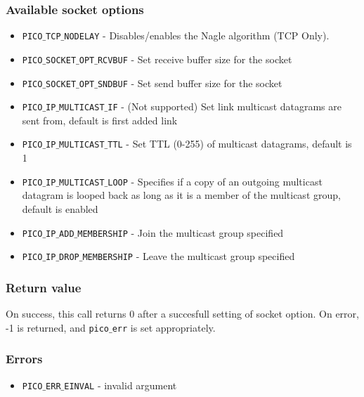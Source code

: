 \subsubsection*{Available socket options}
\begin{itemize}[noitemsep]
\item \texttt{PICO$\_$TCP$\_$NODELAY} - Disables/enables the Nagle algorithm (TCP Only). 
\item \texttt{PICO$\_$SOCKET$\_$OPT$\_$RCVBUF} - Set receive buffer size for the socket
\item \texttt{PICO$\_$SOCKET$\_$OPT$\_$SNDBUF} - Set send buffer size for the socket 
\item \texttt{PICO$\_$IP$\_$MULTICAST$\_$IF} - (Not supported) Set link multicast datagrams are sent from, default is first added link
\item \texttt{PICO$\_$IP$\_$MULTICAST$\_$TTL} - Set TTL (0-255) of multicast datagrams, default is 1
\item \texttt{PICO$\_$IP$\_$MULTICAST$\_$LOOP} - Specifies if a copy of an outgoing multicast datagram is looped back as long as it is a member of the multicast group, default is enabled
\item \texttt{PICO$\_$IP$\_$ADD$\_$MEMBERSHIP} - Join the multicast group specified
\item \texttt{PICO$\_$IP$\_$DROP$\_$MEMBERSHIP} - Leave the multicast group specified
\end{itemize}

\subsubsection*{Return value}
On success, this call returns 0 after a succesfull setting of socket option.
On error, -1 is returned, and \texttt{pico$\_$err} is set appropriately.

\subsubsection*{Errors}
\begin{itemize}[noitemsep]
\item \texttt{PICO$\_$ERR$\_$EINVAL} - invalid argument
\end{itemize}


